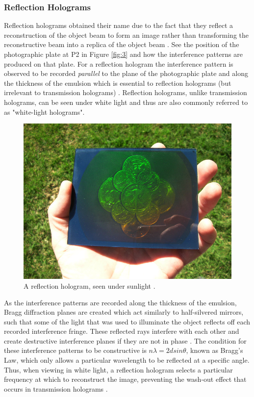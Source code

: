 \documentclass[12pt]{article}
\begin{document}
\subsubsection{Reflection Holograms}

Reflection holograms obtained their name due to the fact that they reflect a reconstruction of the object beam to form an image rather than transforming the reconstructive beam into a replica of the object beam \cite{princetonholo}.
See the position of the photographic plate at P2 in Figure \ref{fig:3} and how the interference patterns are produced on that plate.
For a reflection hologram the interference pattern is observed to be recorded \textit{parallel} to the plane of the photographic plate and along the thickness of the emulsion which is essential to reflection holograms (but irrelevant to transmission holograms) \cite{princetonholo}.
Reflection holograms, unlike transmission holograms, can be seen under white light and thus are also commonly referred to as "white-light holograms".

\begin{figure}[H]
    \centering
    \includegraphics[width=.5\textwidth]{reflection hologram.jpg}
    \caption{\centering A reflection hologram, seen under sunlight \protect\cite{reftransholo}.}
    \label{fig:8}
\end{figure}

As the interference patterns are recorded along the thickness of the emulsion, Bragg diffraction planes are created which act similarly to half-silvered mirrors, such that some of the light that was used to illuminate the object
reflects off each recorded interference fringe. These reflected rays interfere with each other and create destructive interference planes if they are not in phase \cite{princetonholo}. The condition for these interference patterns to be constructive is $n \lambda = 2 d sin \theta$, known as Bragg's Law, which only
allows a particular wavelength to be reflected at a specific angle. Thus, when viewing in white light, a reflection hologram selects a particular frequency at which to reconstruct the image, preventing the wash-out effect that occurs in transmission holograms \cite{princetonholo}.
\end{document}
